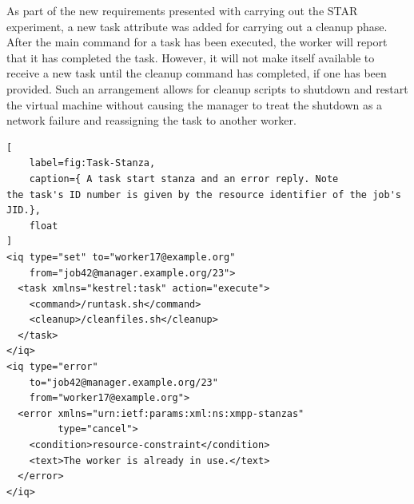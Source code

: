 As part of the new requirements presented with carrying out the STAR
experiment, a new task attribute was added for carrying out a cleanup
phase. After the main command for a task has been executed, the worker
will report that it has completed the task. However, it will not make
itself available to receive a new task until the cleanup command has
completed, if one has been provided. Such an arrangement allows for
cleanup scripts to shutdown and restart the virtual machine without
causing the manager to treat the shutdown as a network failure and
reassigning the task to another worker.

\begin{lstlisting}[
    label=fig:Task-Stanza,
    caption={ A task start stanza and an error reply. Note
the task's ID number is given by the resource identifier of the job's
JID.},
    float
]
<iq type="set" to="worker17@example.org" 
    from="job42@manager.example.org/23">
  <task xmlns="kestrel:task" action="execute"> 
    <command>/runtask.sh</command> 
    <cleanup>/cleanfiles.sh</cleanup>
  </task> 
</iq>
<iq type="error" 
    to="job42@manager.example.org/23" 
    from="worker17@example.org">
  <error xmlns="urn:ietf:params:xml:ns:xmpp-stanzas" 
         type="cancel"> 
    <condition>resource-constraint</condition> 
    <text>The worker is already in use.</text> 
  </error> 
</iq>
\end{lstlisting}

